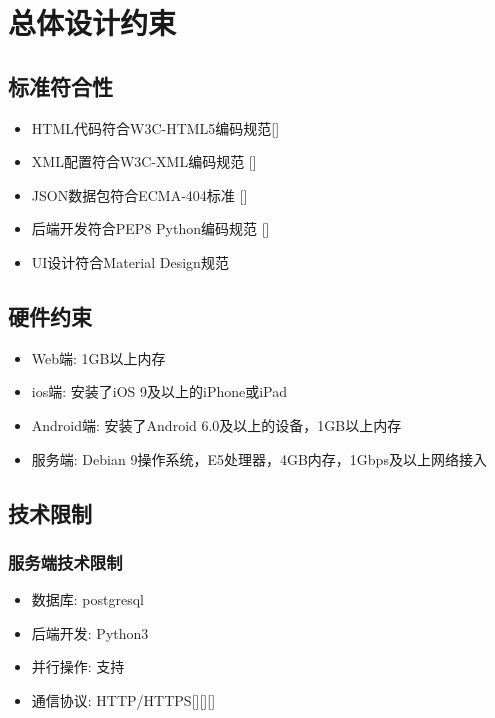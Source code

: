 \chapter{总体设计约束}


\section{标准符合性}


\begin{itemize}
	\item HTML代码符合W3C-HTML5编码规范[\cite{hickson2011html5}]
	\item XML配置符合W3C-XML编码规范 [\cite{bray1997extensible}]
	\item JSON数据包符合ECMA-404标准 [\cite{bray2017javascript}]
	\item 后端开发符合PEP8 Python编码规范 [\cite{van2001pep}]
	\item UI设计符合Material Design规范
\end{itemize}


\section{硬件约束}

\begin{itemize}
	\item Web端: 1GB以上内存
	\item ios端: 安装了iOS 9及以上的iPhone或iPad
	\item Android端: 安装了Android 6.0及以上的设备，1GB以上内存
	\item 服务端: Debian 9操作系统，E5处理器，4GB内存，1Gbps及以上网络接入
\end{itemize}


\section{技术限制}

\subsection{服务端技术限制}

\begin{itemize}
	\item 数据库: postgresql
	\item 后端开发: Python3
	\item 并行操作: 支持
	\item 通信协议: HTTP/HTTPS[\cite{berners1996hypertext}][\cite{fielding1999hypertext}][\cite{rescorla2000http}]
\end{itemize}

